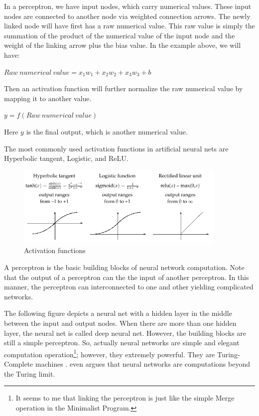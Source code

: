 \documentclass[final]{ua-thesis}
\numberwithin{equation}{section}
\begin{document}
In a perceptron, we have input nodes, which carry numerical values. These input nodes are connected to another node via weighted connection arrows. The newly linked node will have first has a raw numerical value. This raw value is simply the summation of the product of the numerical value of the input node and the weight of the linking arrow plus the bias value. In the example above, we will have:

\begin{exe}
\ex $Raw\ numerical\ value= x_{1}w_{1}+x_{2}w_{2}+x_{3}w_{3}+b$
\end{exe}

Then an activation function will further normalize the raw numerical value by mapping it to another value. 

\begin{exe}
\ex $y=f(Raw\ numerical\ value)$
\end{exe}

Here $y$ is the final output, which is another numerical value. 

The most commonly used activation functions in artificial neural nets are Hyperbolic tangent, Logistic, and ReLU.

\begin{figure}
\caption{Activation functions}
\centering
\includegraphics[width=0.9\textwidth]{activation_function.png}
\end{figure} 

A perceptron is the basic building blocks of neural network computation. Note that the output of a perceptron can the the input of another perceptron. 
In this manner, the perceptron can interconnected to one and other yielding complicated networks. 


The following figure depicts a neural net with a hidden layer in the middle between the input and output nodes. When there are more than one hidden layer, the neural net is called deep neural net. However, the building blocks are still a simple perceptron. So, actually neural networks are simple and elegant computation operation\footnote{It seems to me that linking the perceptron is just like the simple Merge operation in the Minimalist Program.}; 
however, they extremely powerful. They are Turing-Complete machines \citep{siegelmann1991turing, graves2014neural}. \citet{siegelmann2003neural, siegelmann2012neural} even argues that neural networks are computations beyond the Turing limit. 
\end{document}
